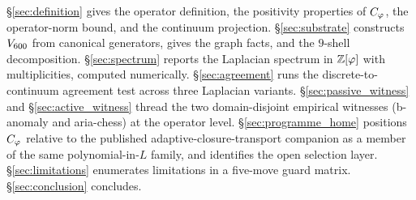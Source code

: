 \S\ref{sec:definition} gives the operator definition, the positivity
properties of $C_{\varphi}$, the operator-norm bound, and the continuum
projection. \S\ref{sec:substrate} constructs $V_{600}$ from
canonical generators, gives the graph facts, and the $9$-shell
decomposition. \S\ref{sec:spectrum} reports the Laplacian spectrum
in $\mathbb{Z}[\varphi]$ with multiplicities, computed numerically.
\S\ref{sec:agreement} runs the discrete-to-continuum agreement test
across three Laplacian variants. \S\ref{sec:passive_witness} and
\S\ref{sec:active_witness} thread the two domain-disjoint empirical
witnesses (b-anomaly and aria-chess) at the operator level.
\S\ref{sec:programme_home} positions $C_{\varphi}$ relative to the
published adaptive-closure-transport companion as a member of the
same polynomial-in-$L$ family, and identifies the open selection
layer. \S\ref{sec:limitations} enumerates limitations in a
five-move guard matrix. \S\ref{sec:conclusion} concludes.
